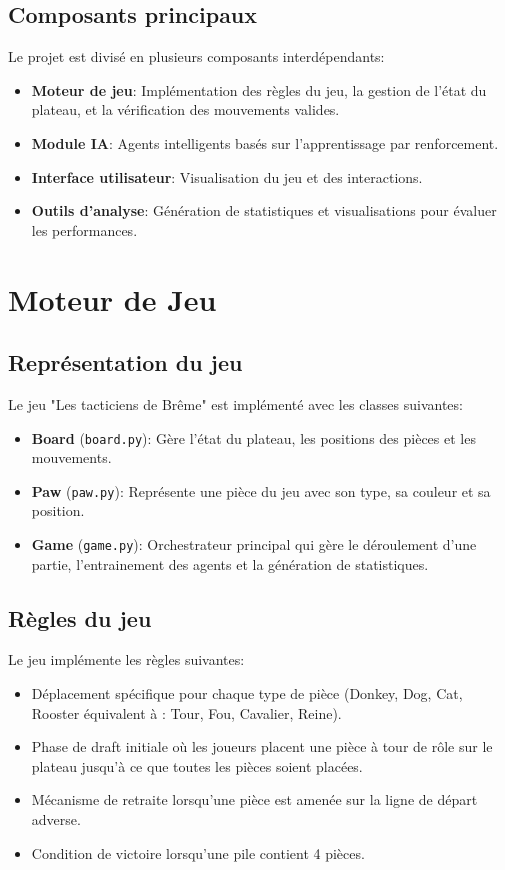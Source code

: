 \documentclass[]{article}
\begin{document}
\subsection{Composants principaux}
Le projet est divisé en plusieurs composants interdépendants:

\begin{itemize}
  \item \textbf{Moteur de jeu}: Implémentation des règles du jeu, la gestion de l'état du plateau, et la vérification des mouvements valides.
  \item \textbf{Module IA}: Agents intelligents basés sur l'apprentissage par renforcement.
  \item \textbf{Interface utilisateur}: Visualisation du jeu et des interactions.
  \item \textbf{Outils d'analyse}: Génération de statistiques et visualisations pour évaluer les performances.
\end{itemize}

\section{Moteur de Jeu}

\subsection{Représentation du jeu}
Le jeu "Les tacticiens de Brême" est implémenté avec les classes suivantes:

\begin{itemize}
  \item \textbf{Board} (\texttt{board.py}): Gère l'état du plateau, les positions des pièces et les mouvements.
  \item \textbf{Paw} (\texttt{paw.py}): Représente une pièce du jeu avec son type, sa couleur et sa position.
  \item \textbf{Game} (\texttt{game.py}): Orchestrateur principal qui gère le déroulement d'une partie, l'entrainement des agents et la génération de statistiques.
\end{itemize}

\subsection{Règles du jeu}
Le jeu implémente les règles suivantes:
\begin{itemize}
  \item Déplacement spécifique pour chaque type de pièce (Donkey, Dog, Cat, Rooster équivalent à : Tour, Fou, Cavalier, Reine).
  \item Phase de draft initiale où les joueurs placent une pièce à tour de rôle	sur le plateau jusqu'à ce que toutes les pièces soient placées.
  \item Mécanisme de retraite lorsqu'une pièce est amenée sur la ligne de départ adverse.
  \item Condition de victoire lorsqu'une pile contient 4 pièces.
\end{itemize}
\end{document}
